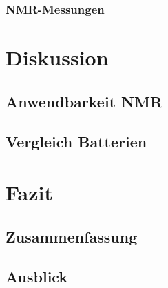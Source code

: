 \documentclass[a4paper, 11pt, headsepline,footsepline,twoside,abstract]{scrbook}
\begin{document}
\subsection{NMR-Messungen}
\chapter{Diskussion}
\section{Anwendbarkeit NMR}
\section{Vergleich Batterien}
\chapter{Fazit}
\section{Zusammenfassung}
\section{Ausblick}
\renewcommand{\thesection}{\Alph{section}}

\cleardoublepage
{}
\listoffigures

\cleardoublepage
{}

 

\end{document}
